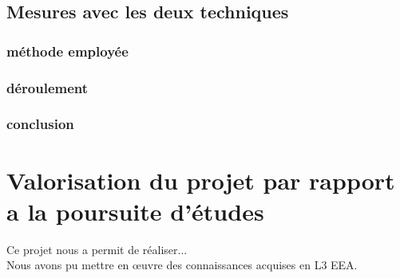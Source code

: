 \documentclass[a4paper]{report}
\begin{document}
	\section{Mesures avec les deux techniques}
	\subsection{méthode employée}
	\subsection{déroulement}
	\subsection{conclusion}
	

	\chapter{Valorisation du projet par rapport a la poursuite d'études}
	
		Ce projet nous a permit de réaliser... \\
		Nous avons pu mettre en œuvre des connaissances acquises en L3 EEA.\\
	
 
\end{document}
